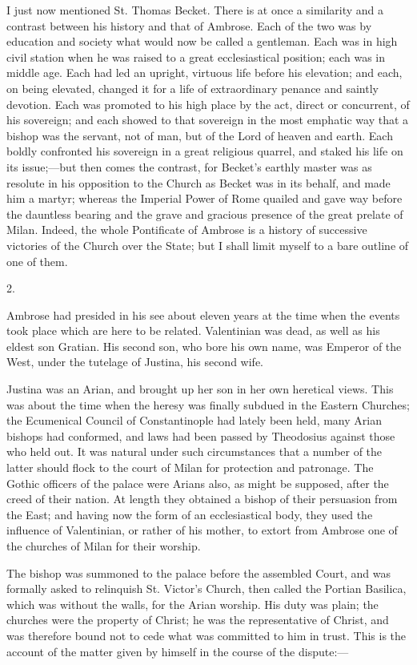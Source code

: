 I just now mentioned St. Thomas Becket. There is at once a
similarity and a contrast between his history and that of Ambrose.
Each of the two was by education and society what would now be called
a gentleman. Each was in high civil station when he was raised
to a great ecclesiastical position; each was in middle age. Each had
led an upright, virtuous life before his elevation; and each, on being
elevated, changed it for a life of extraordinary penance and saintly
devotion. Each was promoted to his high place by the act, direct or
concurrent, of his sovereign; and each showed to that sovereign in the
most emphatic way that a bishop was the servant, not of man, but of
the Lord of heaven and earth. Each boldly confronted his sovereign in
a great religious quarrel, and staked his life on its issue;—but
then comes the contrast, for Becket's earthly master was as resolute
in his opposition to the Church as Becket was in its behalf, and made
him a martyr; whereas the Imperial Power of Rome quailed and gave way
before the dauntless bearing and the grave and gracious presence of
the great prelate of Milan. Indeed, the whole Pontificate of Ambrose
is a history of successive victories of the Church over the State; but
I shall limit myself to a bare outline of one of them.

2.

Ambrose had presided in his see about eleven years at the time when
the events took place which are here to be related. Valentinian was
dead, as well as his eldest son Gratian. His second son, who bore his
own name, was Emperor of the West, under the tutelage of Justina, his
second wife.

Justina was an Arian, and brought up her son in her own heretical
views. This was about the time when the heresy was finally subdued in
the Eastern Churches; the Ecumenical Council of Constantinople had
lately been held, many Arian bishops had conformed, and laws had been
passed by Theodosius against those who held out. It was natural
under such circumstances that a number of the latter should flock to
the court of Milan for protection and patronage. The Gothic officers
of the palace were Arians also, as might be supposed, after the creed
of their nation. At length they obtained a bishop of their persuasion
from the East; and having now the form of an ecclesiastical body, they
used the influence of Valentinian, or rather of his mother, to extort
from Ambrose one of the churches of Milan for their worship.

The bishop was summoned to the palace before the assembled Court,
and was formally asked to relinquish St. Victor's Church, then called
the Portian Basilica, which was without the walls, for the Arian
worship. His duty was plain; the churches were the property of Christ;
he was the representative of Christ, and was therefore bound not to
cede what was committed to him in trust. This is the account of the
matter given by himself in the course of the dispute:—

